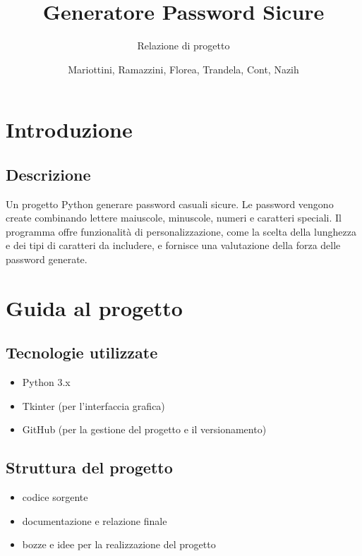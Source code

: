 \documentclass{scrartcl}
\title{Generatore Password Sicure}
\subtitle{Relazione di progetto}
\author{Mariottini, Ramazzini, Florea, Trandela, Cont, Nazih}
\date{}
\begin{document}
    \maketitle

    \section{Introduzione}

        \subsection{Descrizione}

            Un progetto Python generare password casuali sicure. Le password vengono create combinando lettere maiuscole, minuscole, numeri e caratteri speciali. Il programma offre funzionalità di personalizzazione, come la scelta della lunghezza e dei tipi di caratteri da includere, e fornisce una valutazione della forza delle password generate.

    \section{Guida al progetto}

        \subsection{Tecnologie utilizzate}

            \begin{itemize}            
                \item Python 3.x
                \item Tkinter (per l'interfaccia grafica)
                \item GitHub (per la gestione del progetto e il versionamento)
            \end{itemize}

        \subsection{Struttura del progetto}

            \begin{itemize}
                \item {} codice sorgente
                \item {} documentazione e relazione finale
                \item {} bozze e idee per la realizzazione del progetto
            \end{itemize}
\end{document}
